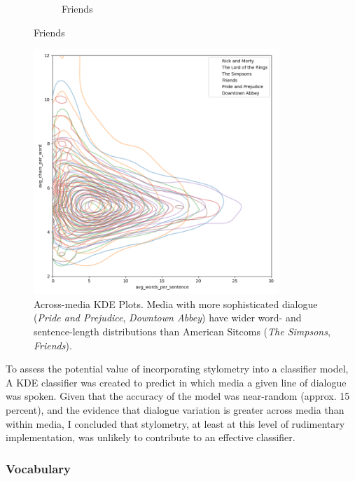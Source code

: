 \documentclass{article}
\newcommand{\largeimagewidth}{350}
\begin{document}
\begin{titlepage}
\begin{figure}[H]
\begin{subfigure}[b]{0.45\textwidth}
        \caption{Friends}
        \label{fig:subfig2}
    \end{subfigure}
    \label{fig:main}
\end{figure} 

\begin{figure}[H]
\centering
\includegraphics[width=\largeimagewidth]{images/3d_kde_test_final.png}
\caption{Across-media KDE Plots. Media with more sophisticated dialogue (\textit{Pride and Prejudice}, \textit{Downtown Abbey}) have wider word- and sentence-length distributions than American Sitcoms (\textit{The Simpsons}, \textit{Friends}).}
\end{figure}

To assess the potential value of incorporating stylometry into a classifier model, A KDE classifier was created to predict in which media a given line of dialogue was spoken. Given that the accuracy of the model was near-random (approx. 15 percent), and the evidence that dialogue variation is greater across media than within media, I concluded that stylometry, at least at this level of rudimentary implementation, was unlikely to contribute to an effective classifier.

\subsubsection{Vocabulary}


\end{titlepage}
\end{document}
